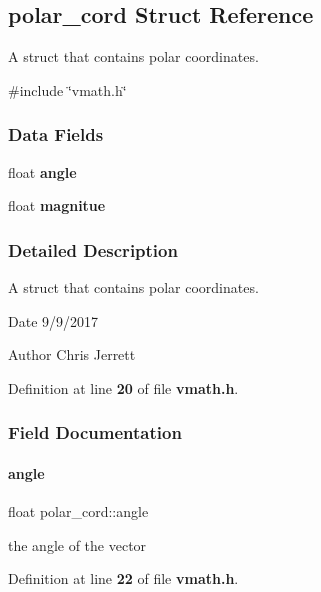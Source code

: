 \subsection{polar\+\_\+cord Struct Reference}
\label{structpolar__cord}


A struct that contains polar coordinates.  




{\ttfamily \#include \char`\"{}vmath.\+h\char`\"{}}

\subsubsection*{Data Fields}
\begin{DoxyCompactItemize}
\item 
float \textbf{ angle}
\item 
float \textbf{ magnitue}
\end{DoxyCompactItemize}


\subsubsection{Detailed Description}
A struct that contains polar coordinates. 

\begin{DoxyDate}{Date}
9/9/2017 
\end{DoxyDate}
\begin{DoxyAuthor}{Author}
Chris Jerrett 
\end{DoxyAuthor}


Definition at line \textbf{ 20} of file \textbf{ vmath.\+h}.



\subsubsection{Field Documentation}
\mbox{\label{structpolar__cord_a81b3a11d38d76719b02fcd425adaa216}} 
\paragraph{angle}
{\footnotesize\ttfamily float polar\+\_\+cord\+::angle}

the angle of the vector 

Definition at line \textbf{ 22} of file \textbf{ vmath.\+h}.



